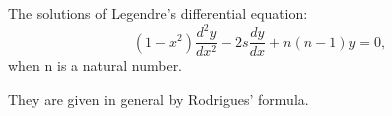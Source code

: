 The solutions of Legendre's differential equation:
\[ ( 1 - x ^2 ) \frac{d ^2 y}{dx^2} - 2s \frac{dy}{dx} + n(n-1)y = 0 , \]
when n is a natural number.
\par
They are given in general by Rodrigues' formula.